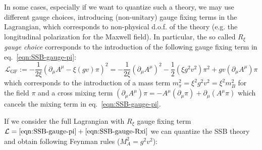 \documentclass[TheoreticalPhy_ModB.tex]{subfiles}
\begin{document}
In some cases, especially if we want to quantize such a theory, we may use different gauge choices, introducing (non-unitary) gauge fixing terms in the Lagrangian, which corresponds to non-physical d.o.f. of the theory (e.g. the longitudinal polarization for the Maxwell field). In particular, the so called \emph{$R_\xi$ gauge choice} corresponds to the introduction of the following gauge fixing term in eq.~\eqref{eqn:SSB-gauge-pi}:
\begin{equation}\label{eqn:SSB-gauge-Rxi}
\mathcal L_{\text{GF}}:=-\frac1{2\xi}(\partial_\mu A^\mu-\xi(gv)\pi)^2=-\frac1{2\xi}(\partial_\mu A^\mu)^2-\frac12(\xi g^2v^2)\pi^2+gv(\partial_\mu A^\mu)\pi
\end{equation}
which corresponds to the introduction of a mass term $m_\pi^2=\xi^2g^2v^2=\xi^2m_B^2$ for the field $\pi$ and a cross mixing term $(\partial_\mu A^\mu)\pi=-A^\mu(\partial_\mu\pi)+\partial_\mu(A^\mu\pi)$ which cancels the mixing term in eq.~\eqref{eqn:SSB-gauge-pi}. 

If we consider the full Lagrangian with $R_\xi$ gauge fixing term $\mathcal L=\eqref{eqn:SSB-gauge-pi}+\eqref{eqn:SSB-gauge-Rxi}$ we can quantize the SSB theory and obtain following Feynman rules ($M_A^2=g^2v^2$):
\end{document}
